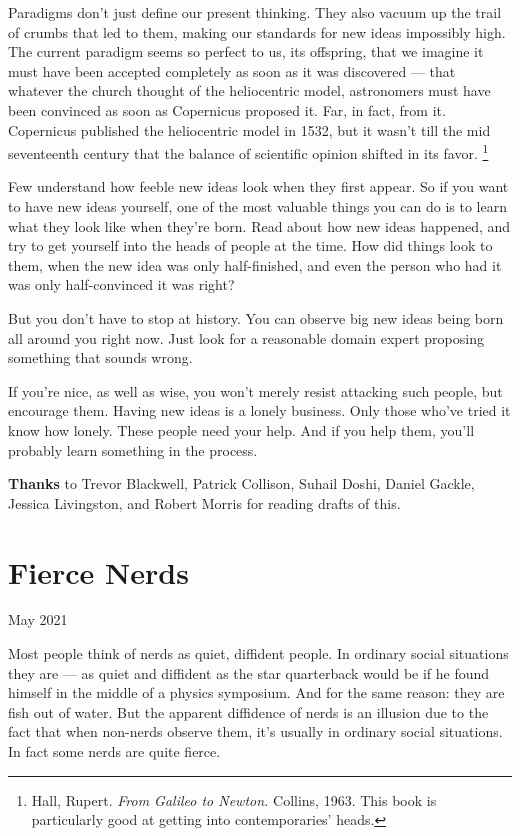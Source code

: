 \documentclass[12pt]{book}
\begin{document}
Paradigms don't just define our present thinking. They also vacuum up
the trail of crumbs that led to them, making our standards for new ideas
impossibly high. The current paradigm seems so perfect to us, its
offspring, that we imagine it must have been accepted completely as soon
as it was discovered --- that whatever the church thought of the
heliocentric model, astronomers must have been convinced as soon as
Copernicus proposed it. Far, in fact, from it. Copernicus published the
heliocentric model in 1532, but it wasn't till the mid seventeenth
century that the balance of scientific opinion shifted in its favor.
\footnote{Hall, Rupert. \emph{From Galileo to Newton.} Collins, 1963. This
book is particularly good at getting into contemporaries' heads.}

Few understand how feeble new ideas look when they first appear. So if
you want to have new ideas yourself, one of the most valuable things you
can do is to learn what they look like when they're born. Read about how
new ideas happened, and try to get yourself into the heads of people at
the time. How did things look to them, when the new idea was only
half-finished, and even the person who had it was only half-convinced it
was right?

But you don't have to stop at history. You can observe big new ideas
being born all around you right now. Just look for a reasonable domain
expert proposing something that sounds wrong.

If you're nice, as well as wise, you won't merely resist attacking such
people, but encourage them. Having new ideas is a lonely business. Only
those who've tried it know how lonely. These people need your help. And
if you help them, you'll probably learn something in the process.


\textbf{Thanks} to Trevor Blackwell, Patrick Collison, Suhail Doshi,
Daniel Gackle, Jessica Livingston, and Robert Morris for reading drafts
of this.
\chapter{Fierce Nerds}

May 2021

Most people think of nerds as quiet, diffident people. In ordinary
social situations they are --- as quiet and diffident as the star
quarterback would be if he found himself in the middle of a physics
symposium. And for the same reason: they are fish out of water. But the
apparent diffidence of nerds is an illusion due to the fact that when
non-nerds observe them, it's usually in ordinary social situations. In
fact some nerds are quite fierce.
\end{document}
